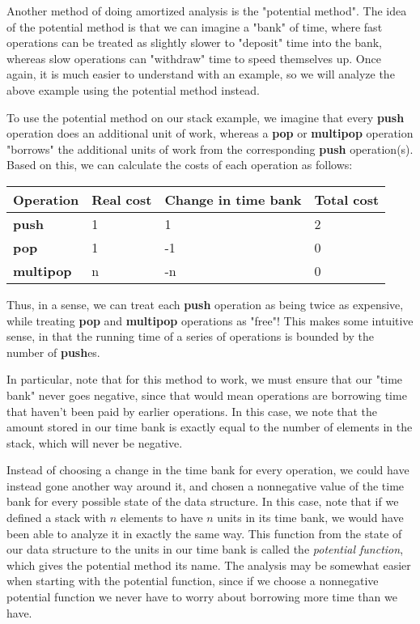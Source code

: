 Another method of doing amortized analysis is the "potential method". The idea of the potential method is that we can imagine a "bank" of time, where fast operations can be treated as slightly slower to "deposit" time into the bank, whereas slow operations can "withdraw" time to speed themselves up. Once again, it is much easier to understand with an example, so we will analyze the above example using the potential method instead.

To use the potential method on our stack example, we imagine that every \textbf{push} operation does an additional unit of work, whereas a \textbf{pop} or \textbf{multipop} operation "borrows" the additional units of work from the corresponding \textbf{push} operation(s). Based on this, we can calculate the costs of each operation as follows:

\begin{center}
  \begin{tabular}{ | l || l | l | l |}
    \hline
    Operation & Real cost & Change in time bank & Total cost \\ 
    \hline \hline
    \textbf{push} & 1 & 1 & 2 \\
    \hline
    \textbf{pop} & 1 & -1 & 0 \\
    \hline
    \textbf{multipop} & n & -n & 0 \\
    \hline
  \end{tabular}
\end{center}

Thus, in a sense, we can treat each \textbf{push} operation as being twice as expensive, while treating \textbf{pop} and \textbf{multipop} operations as "free"! This makes some intuitive sense, in that the running time of a series of operations is bounded by the number of \textbf{push}es.

In particular, note that for this method to work, we must ensure that our "time bank" never goes negative, since that would mean operations are borrowing time that haven't been paid by earlier operations. In this case, we note that the amount stored in our time bank is exactly equal to the number of elements in the stack, which will never be negative. 

Instead of choosing a change in the time bank for every operation, we could have instead gone another way around it, and chosen a nonnegative value of the time bank for every possible state of the data structure. In this case, note that if we defined a stack with $n$ elements to have $n$ units in its time bank, we would have been able to analyze it in exactly the same way. This function from the state of our data structure to the units in our time bank is called the \textit{potential function}, which gives the potential method its name. The analysis may be somewhat easier when starting with the potential function, since if we choose a nonnegative potential function we never have to worry about borrowing more time than we have.

